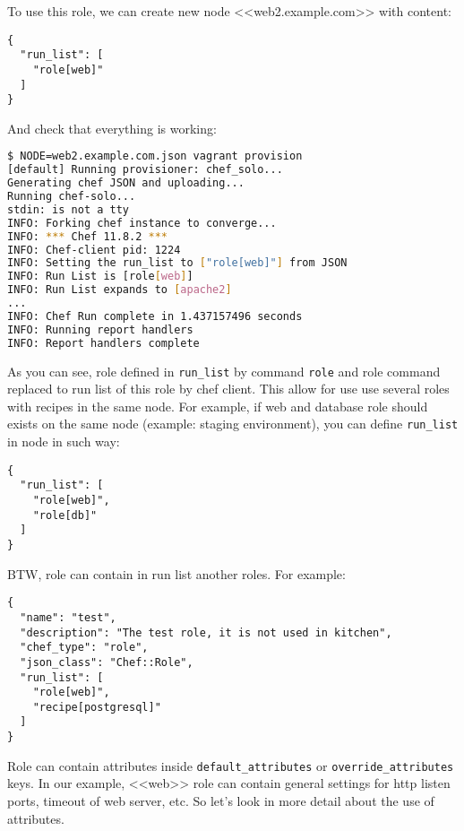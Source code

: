 To use this role, we can create new node <<web2.example.com>> with content:

\begin{lstlisting}[label=lst:my-cloud-role2,title=my-cloud/nodes/web2.example.com.json]
{
  "run_list": [
    "role[web]"
  ]
}
\end{lstlisting}

And check that everything is working:

\begin{lstlisting}[language=Bash,label=lst:my-cloud-role3]
$ NODE=web2.example.com.json vagrant provision
[default] Running provisioner: chef_solo...
Generating chef JSON and uploading...
Running chef-solo...
stdin: is not a tty
INFO: Forking chef instance to converge...
INFO: *** Chef 11.8.2 ***
INFO: Chef-client pid: 1224
INFO: Setting the run_list to ["role[web]"] from JSON
INFO: Run List is [role[web]]
INFO: Run List expands to [apache2]
...
INFO: Chef Run complete in 1.437157496 seconds
INFO: Running report handlers
INFO: Report handlers complete
\end{lstlisting}

As you can see, role defined in \lstinline!run_list! by command \lstinline!role! and role command replaced to run list of this role by chef client. This allow for use use several roles with recipes in the same node. For example, if web and database role should exists on the same node (example: staging environment), you can define \lstinline!run_list! in node in such way:

\begin{lstlisting}[label=lst:my-cloud-role4,title=my-cloud/nodes/web2.example.com.json]
{
  "run_list": [
    "role[web]",
    "role[db]"
  ]
}
\end{lstlisting}

BTW, role can contain in run list another roles. For example:

\begin{lstlisting}[label=lst:my-cloud-role5,title=my-cloud/roles/test.json]
{
  "name": "test",
  "description": "The test role, it is not used in kitchen",
  "chef_type": "role",
  "json_class": "Chef::Role",
  "run_list": [
    "role[web]",
    "recipe[postgresql]"
  ]
}
\end{lstlisting}

Role can contain attributes inside \lstinline!default_attributes! or \lstinline!override_attributes! keys. In our example, <<web>> role can contain general settings for http listen ports, timeout of web server, etc. So let's look in more detail about the use of attributes.
